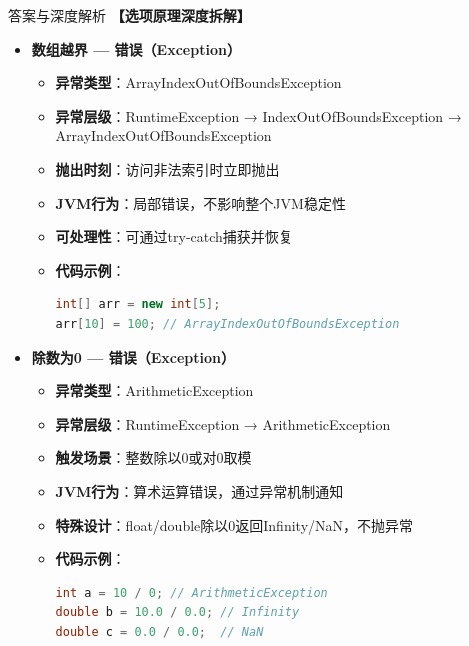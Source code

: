 \documentclass[12pt, a4paper]{ctexart}
\begin{document}
\begin{enumerate}[label=\textbf{\arabic*.}]
\begin{bluebox}{答案与深度解析}
		      \textbf{【选项原理深度拆解】}

		      \begin{itemize}[leftmargin=*, nosep, label={}]
			      \item[A] \textbf{数组越界 — 错误（Exception）}
			            \begin{itemize}[label={}, leftmargin=*, nosep]
				            \item \textbf{异常类型}：ArrayIndexOutOfBoundsException
				            \item \textbf{异常层级}：RuntimeException → IndexOutOfBoundsException → ArrayIndexOutOfBoundsException
				            \item \textbf{抛出时刻}：访问非法索引时立即抛出
				            \item \textbf{JVM行为}：局部错误，不影响整个JVM稳定性
				            \item \textbf{可处理性}：可通过try-catch捕获并恢复
				            \item \textbf{代码示例}：
				                  \begin{lstlisting}[language=Java]
int[] arr = new int[5];
arr[10] = 100; // ArrayIndexOutOfBoundsException
				            \end{lstlisting}
			            \end{itemize}

			      \item[B] \textbf{除数为0 — 错误（Exception）}
			            \begin{itemize}[label={}, leftmargin=*, nosep]
				            \item \textbf{异常类型}：ArithmeticException
				            \item \textbf{异常层级}：RuntimeException → ArithmeticException
				            \item \textbf{触发场景}：整数除以0或对0取模
				            \item \textbf{JVM行为}：算术运算错误，通过异常机制通知
				            \item \textbf{特殊设计}：float/double除以0返回Infinity/NaN，不抛异常
				            \item \textbf{代码示例}：
				                  \begin{lstlisting}[language=Java]
int a = 10 / 0; // ArithmeticException
double b = 10.0 / 0.0; // Infinity
double c = 0.0 / 0.0;  // NaN
				            \end{lstlisting}
			            \end{itemize}


\end{itemize}
\end{bluebox}
\end{enumerate}
\end{document}
